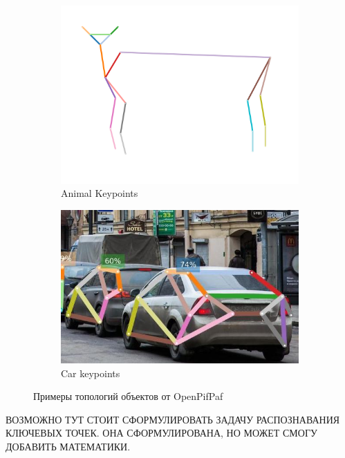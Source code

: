 \begin{figure}[h]
\begin{subfigure}[b]{0.48\textwidth}
	\centering
	\includegraphics[width=\textwidth]{./images/plugins_animalpose.png}
	\caption{Animal Keypoints}
\end{subfigure}
\begin{subfigure}[b]{0.48\textwidth}
	\centering
	\includegraphics[width=\textwidth]{./images/car_topology.jpg}
	\caption{Car keypoints}
\end{subfigure}
	\caption{Примеры топологий объектов от OpenPifPaf \cite{OpenPifPaf2021}}
	\label{fig:topology_exaples}
\end{figure}


ВОЗМОЖНО ТУТ СТОИТ СФОРМУЛИРОВАТЬ ЗАДАЧУ РАСПОЗНАВАНИЯ КЛЮЧЕВЫХ ТОЧЕК. ОНА СФОРМУЛИРОВАНА, НО МОЖЕТ СМОГУ ДОБАВИТЬ МАТЕМАТИКИ.

